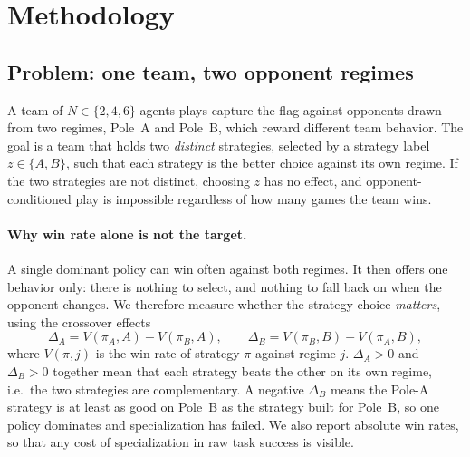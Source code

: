 %

\section{Methodology}
\label{sec:method-suite}

\subsection{Problem: one team, two opponent regimes}
\label{sec:method-problem}

A team of \(N\in\{2,4,6\}\) agents plays capture-the-flag against opponents
drawn from two regimes, Pole~A and Pole~B, which reward different team
behavior. The goal is a team that holds two \emph{distinct} strategies,
selected by a strategy label \(z\in\{A,B\}\), such that each strategy is the
better choice against its own regime. If the two strategies are not distinct,
choosing \(z\) has no effect, and opponent-conditioned play is impossible
regardless of how many games the team wins.

\paragraph{Why win rate alone is not the target.}
A single dominant policy can win often against both regimes. It then offers
one behavior only: there is nothing to select, and nothing to fall back on
when the opponent changes. We therefore measure whether the strategy choice
\emph{matters}, using the crossover effects
\[
\Delta_A = V(\pi_A,A)-V(\pi_B,A),\qquad
\Delta_B = V(\pi_B,B)-V(\pi_A,B),
\]
where \(V(\pi,j)\) is the win rate of strategy \(\pi\) against regime \(j\).
\(\Delta_A>0\) and \(\Delta_B>0\) together mean that each strategy beats the
other on its own regime, i.e.\ the two strategies are complementary. A
negative \(\Delta_B\) means the Pole-A strategy is at least as good on Pole~B
as the strategy built for Pole~B, so one policy dominates and specialization
has failed. We also report absolute win rates, so that any cost of
specialization in raw task success is visible.

